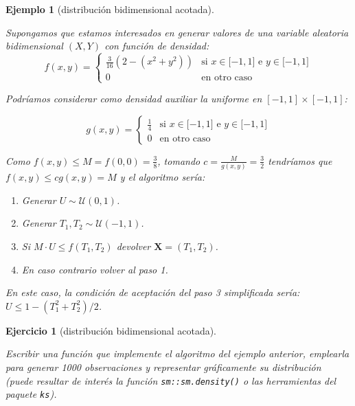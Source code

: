 \documentclass[
]{book}
\theoremstyle{break}
\newtheorem{exercise}{Ejercicio}[chapter]
\newtheorem{example}{Ejemplo}[chapter]
\theoremstyle{nonumberplain}
\begin{document}
\begin{example}[distribución bidimensional acotada]
\protect\hypertarget{exm:ar-bidim}{}\label{exm:ar-bidim}

Supongamos que estamos interesados en generar valores de una variable aleatoria bidimensional
\(\left( X,Y\right)\) con función de densidad:
\[f(x,y)=\left\{ 
\begin{array}{cl}
\frac{3}{16}\left( 2-\left( x^2+y^2\right) \right)  & \text{si }x\in
\lbrack -1,1]\text{ e }y\in \lbrack -1,1] \\ 
0 & \text{en otro caso}
\end{array}
\right.\]

Podríamos considerar como densidad auxiliar la uniforme en \(\left[ -1,1\right] \times\left[ -1,1\right]\):

\[g\left( x, y \right)  =\left\{
\begin{array}{ll}
\frac{1}{4} & \text{si }x\in \lbrack -1,1]\text{ e }y\in \lbrack -1,1] \\
0 &  \text{en otro caso}
\end{array}\right.\]

Como \(f(x, y) \leq M = f(0,0) = \frac38\), tomando \(c=\frac{M}{g(x,y)} = \frac32\)
tendríamos que \(f(x,y) \leq cg(x,y) = M\) y el algoritmo sería:

\begin{enumerate}
\def\labelenumi{\arabic{enumi}.}
\item
  Generar \(U \sim \mathcal{U}\left( 0, 1\right)\).
\item
  Generar \(T_1, T_2 \sim \mathcal{U}\left( -1, 1 \right)\).
\item
  Si \(M \cdot U\leq f\left( T_1, T_2 \right)\)
  devolver \(\mathbf{X} = \left( T_1, T_2 \right)\).
\item
  En caso contrario volver al paso 1.
\end{enumerate}

En este caso, la condición de aceptación del paso 3 simplificada sería:
\(U \leq 1 - \left( T_1^2 + T_2^2 \right) / 2\).
\end{example}

\begin{exercise}[distribución bidimensional acotada]
\protect\hypertarget{exr:ar-bidim-r}{}\label{exr:ar-bidim-r}

Escribir una función que implemente el algoritmo del ejemplo anterior, emplearla para generar 1000 observaciones y representar gráficamente su distribución (puede resultar de interés la función \texttt{sm::sm.density()} o las herramientas del paquete \texttt{ks}).
\end{exercise}
\end{document}
